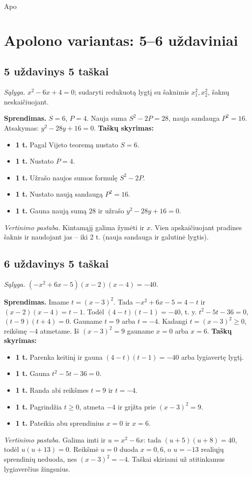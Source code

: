 Apo\documentclass[11pt,a4paper]{article}
\newcommand{\uzd}[3]{\subsection*{#1 uždavinys \hfill #2 taškai}\textit{Sąlyga.} #3\par}
\newcommand{\kriterijai}{\textbf{Taškų skyrimas:}}
\newcommand{\balas}[2]{\item \textbf{#1 t.} #2}
\begin{document}
\section*{Apolono variantas: 5--6 uždaviniai}
\uzd{5}{5}{$x^2-6x+4=0$; sudaryti redukuotą lygtį su šaknimis $x_1^2,x_2^2$, šaknų neskaičiuojant.}
\textbf{Sprendimas.} $S=6$, $P=4$. Nauja suma $S^2-2P=28$, nauja sandauga $P^2=16$. Atsakymas: $y^2-28y+16=0$.
\kriterijai\begin{itemize}
\balas{1}{Pagal Vijeto teoremą nustato $S=6$.}
\balas{1}{Nustato $P=4$.}
\balas{1}{Užrašo naujos sumos formulę $S^2-2P$.}
\balas{1}{Nustato naują sandaugą $P^2=16$.}
\balas{1}{Gauna naują sumą $28$ ir užrašo $y^2-28y+16=0$.}
\end{itemize}
\textit{Vertinimo pastaba.} Kintamąjį galima žymėti ir $x$. Vien apskaičiuojant pradines šaknis ir naudojant jas -- iki 2 t. (nauja sandauga ir galutinė lygtis).
\uzd{6}{5}{$(-x^2+6x-5)(x-2)(x-4)=-40$.}
\textbf{Sprendimas.} Imame $t=(x-3)^2$. Tada $-x^2+6x-5=4-t$ ir $(x-2)(x-4)=t-1$. Todėl $(4-t)(t-1)=-40$, t. y. $t^2-5t-36=0$, $(t-9)(t+4)=0$. Gauname $t=9$ arba $t=-4$. Kadangi $t=(x-3)^2\ge0$, reikšmę $-4$ atmetame. Iš $(x-3)^2=9$ gauname $x=0$ arba $x=6$.
\kriterijai\begin{itemize}
\balas{1}{Parenka keitinį ir gauna $(4-t)(t-1)=-40$ arba lygiavertę lygtį.}
\balas{1}{Gauna $t^2-5t-36=0$.}
\balas{1}{Randa abi reikšmes $t=9$ ir $t=-4$.}
\balas{1}{Pagrindžia $t\ge0$, atmeta $-4$ ir grįžta prie $(x-3)^2=9$.}
\balas{1}{Pateikia abu sprendinius $x=0$ ir $x=6$.}
\end{itemize}
\textit{Vertinimo pastaba.} Galima imti ir $u=x^2-6x$: tada $(u+5)(u+8)=40$, todėl $u(u+13)=0$. Reikšmė $u=0$ duoda $x=0,6$, o $u=-13$ realiųjų sprendinių neduoda, nes $(x-3)^2=-4$. Taškai skiriami už atitinkamus lygiaverčius žingsnius.

\newpage
\end{document}
